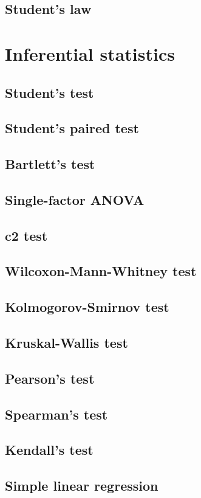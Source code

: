 \documentclass{report}
\begin{document}
	\section{Student’s law}

\chapter{Inferential statistics}
	\section{Student’s test}
	\section{Student’s paired test}
	\section{Bartlett’s test}
	\section{Single-factor ANOVA}
	\section{c2 test}
	\section{Wilcoxon-Mann-Whitney test}
	\section{Kolmogorov-Smirnov test}
	\section{Kruskal-Wallis test}
	\section{Pearson’s test}
	\section{Spearman’s test}
	\section{Kendall’s test}
	\section{Simple linear regression}
\end{document}
